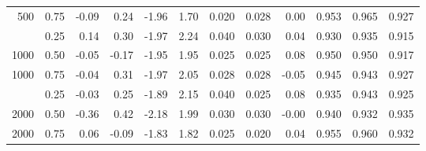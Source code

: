 \begin{table}[t]
\begin{tabular}{rr rr r@{,}l rr r rrr}
500 & 0.75 & -0.09 & 0.24 & -1.96 & 1.70 & 0.020 & 0.028 & 0.00 & 0.953 & 0.965 & 0.927 \\
\addlinespace
1000 & 0.25 & 0.14 & 0.30 & -1.97 & 2.24 & 0.040 & 0.030 & 0.04 & 0.930 & 0.935 & 0.915 \\
1000 & 0.50 & -0.05 & -0.17 & -1.95 & 1.95 & 0.025 & 0.025 & 0.08 & 0.950 & 0.950 & 0.917 \\
1000 & 0.75 & -0.04 & 0.31 & -1.97 & 2.05 & 0.028 & 0.028 & -0.05 & 0.945 & 0.943 & 0.927 \\
\addlinespace
2000 & 0.25 & -0.03 & 0.25 & -1.89 & 2.15 & 0.040 & 0.025 & 0.08 & 0.935 & 0.943 & 0.925 \\
2000 & 0.50 & -0.36 & 0.42 & -2.18 & 1.99 & 0.030 & 0.030 & -0.00 & 0.940 & 0.932 & 0.935 \\
2000 & 0.75 & 0.06 & -0.09 & -1.83 & 1.82 & 0.025 & 0.020 & 0.04 & 0.955 & 0.960 & 0.932 \\
\bottomrule\end{tabular}\end{table}

